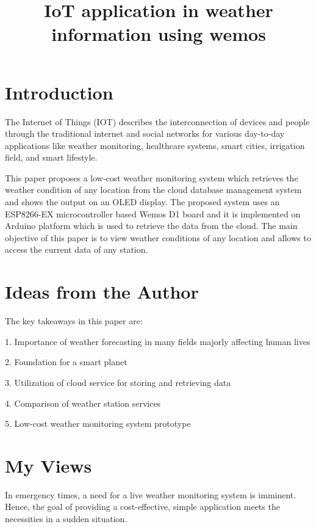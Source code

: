 \documentclass{article}
\title{\textbf{\huge IoT application in weather information using wemos}\\
	}
\date{}
\begin{document}
\pagestyle{headings}	
\newpage
\setcounter{page}{1}
\renewcommand{\thepage}{\arabic{page}}


	
\setlength{\parskip}{0.5em}

	
\maketitle

\section{Introduction}
The Internet of Things (IOT) describes the interconnection of devices and people through the traditional internet and
social networks for various day-to-day applications like weather
monitoring, healthcare systems, smart cities, irrigation field, and
smart lifestyle. 

This paper proposes a
low-cost weather monitoring system which retrieves the weather
condition of any location from the cloud database management
system and shows the output on an OLED display. The proposed
system uses an ESP8266-EX microcontroller based Wemos D1
board and it is implemented on Arduino platform which is used
to retrieve the data from the cloud. The main objective of this
paper is to view weather conditions of any location and allows
to access the current data of any station.

\section{Ideas from the Author}
The key takeaways in this paper are:

1. Importance of weather forecasting in many fields majorly affecting human lives

2. Foundation for a smart planet

3. Utilization of cloud service for storing and retrieving data

4. Comparison of weather station services

5. Low-cost weather monitoring system prototype

\section{My Views}
In emergency times, a need for a live weather monitoring system is imminent. Hence, the goal of providing a cost-effective, simple application meets the necessities in a sudden situation.
\end{document}
